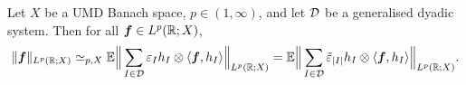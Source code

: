 \begin{thm}\label{thm:general-haar-decompositions}
  Let $X$ be a UMD Banach space, $p \in (1,\infty)$, and let $\mathcal{D}$ be a generalised dyadic system.
  Then for all $\bm{f} \in L^p(\mathbb{R};X)$,
  \begin{equation}\label{eq:gen-haar-sqfn}
      \|\bm{f}\|_{L^p(\mathbb{R};X)}
      \simeq_{p,X} \mathbb{E} \Big\| \sum_{I \in \mathcal{D}} \varepsilon_{I} h_{I} \otimes \langle \bm{f}, h_{I} \rangle \Big\|_{L^p(\mathbb{R};X)} 
      = \mathbb{E} \Big\| \sum_{I \in \mathcal{D}} \tilde{\varepsilon}_{|I|} h_{I} \otimes \langle \bm{f}, h_{I} \rangle \Big\|_{L^p(\mathbb{R};X)}.
    \end{equation}
\end{thm}


